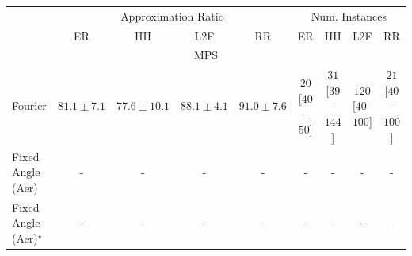 \begin{tabular}{l|cccc|cccc|}
\toprule
& \multicolumn{4}{c|}{Approximation Ratio} & \multicolumn{4}{c|}{Num. Instances} \\
            & ER & HH & L2F & RR & ER & HH & L2F & RR \\
\midrule
\multicolumn{9}{c}{\rule{0pt}{8pt}MPS} \\
\midrule
Fourier & {\cellcolor[HTML]{FFEFAA}} \color[HTML]{000000} $81.1\pm 7.1$ & {\cellcolor[HTML]{FFFFE5}} \color[HTML]{000000} $77.6\pm 10.1$ & {\cellcolor[HTML]{FA8F24}} \color[HTML]{F1F1F1} $88.1\pm 4.1$ & {\cellcolor[HTML]{DF620D}} \color[HTML]{F1F1F1} $91.0\pm 7.6$ & {\cellcolor[HTML]{FFF5F1}} \color[HTML]{000000} $20$ [$40$--$50$] & {\cellcolor[HTML]{FFF2EE}} \color[HTML]{000000} $31$ [$39$--$144$] & {\cellcolor[HTML]{FDD8D5}} \color[HTML]{000000} $120$ [$40$--$100$] & {\cellcolor[HTML]{FFF4F0}} \color[HTML]{000000} $21$ [$40$--$100$] \\
Fixed Angle (Aer) & {\cellcolor[HTML]{000000}} \color[HTML]{F1F1F1} {\cellcolor{white}} \color{black} - & {\cellcolor[HTML]{000000}} \color[HTML]{F1F1F1} {\cellcolor{white}} \color{black} - & {\cellcolor[HTML]{000000}} \color[HTML]{F1F1F1} {\cellcolor{white}} \color{black} - & {\cellcolor[HTML]{000000}} \color[HTML]{F1F1F1} {\cellcolor{white}} \color{black} - & {\cellcolor[HTML]{000000}} \color[HTML]{F1F1F1} {\cellcolor{white}} \color{black} - & {\cellcolor[HTML]{000000}} \color[HTML]{F1F1F1} {\cellcolor{white}} \color{black} - & {\cellcolor[HTML]{000000}} \color[HTML]{F1F1F1} {\cellcolor{white}} \color{black} - & {\cellcolor[HTML]{000000}} \color[HTML]{F1F1F1} {\cellcolor{white}} \color{black} - \\
Fixed Angle (Aer)$^\star$ & {\cellcolor[HTML]{000000}} \color[HTML]{F1F1F1} {\cellcolor{white}} \color{black} - & {\cellcolor[HTML]{000000}} \color[HTML]{F1F1F1} {\cellcolor{white}} \color{black} - & {\cellcolor[HTML]{000000}} \color[HTML]{F1F1F1} {\cellcolor{white}} \color{black} - & {\cellcolor[HTML]{000000}} \color[HTML]{F1F1F1} {\cellcolor{white}} \color{black} - & {\cellcolor[HTML]{000000}} \color[HTML]{F1F1F1} {\cellcolor{white}} \color{black} - & {\cellcolor[HTML]{000000}} \color[HTML]{F1F1F1} {\cellcolor{white}} \color{black} - & {\cellcolor[HTML]{000000}} \color[HTML]{F1F1F1} {\cellcolor{white}} \color{black} - & {\cellcolor[HTML]{000000}} \color[HTML]{F1F1F1} {\cellcolor{white}} \color{black} - \\

\end{tabular}
